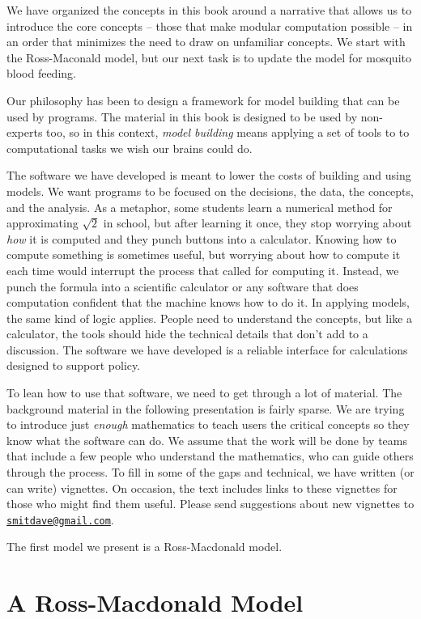 \documentclass[
]{book}
\begin{document}
We have organized the concepts in this book around a narrative that allows us to introduce the core concepts -- those that make modular computation possible -- in an order that minimizes the need to draw on unfamiliar concepts. We start with the Ross-Maconald model, but our next task is to update the model for mosquito blood feeding.

Our philosophy has been to design a framework for model building that can be used by programs. The material in this book is designed to be used by non-experts too, so in this context, \emph{model building} means applying a set of tools to to computational tasks we wish our brains could do.

The software we have developed is meant to lower the costs of building and using models. We want programs to be focused on the decisions, the data, the concepts, and the analysis. As a metaphor, some students learn a numerical method for approximating \(\sqrt{2}\) in school, but after learning it once, they stop worrying about \emph{how} it is computed and they punch buttons into a calculator. Knowing how to compute something is sometimes useful, but worrying about how to compute it each time would interrupt the process that called for computing it. Instead, we punch the formula into a scientific calculator or any software that does computation confident that the machine knows how to do it. In applying models, the same kind of logic applies. People need to understand the concepts, but like a calculator, the tools should hide the technical details that don't add to a discussion. The software we have developed is a reliable interface for calculations designed to support policy.

To lean how to use that software, we need to get through a lot of material. The background material in the following presentation is fairly sparse. We are trying to introduce just \emph{enough} mathematics to teach users the critical concepts so they know what the software can do. We assume that the work will be done by teams that include a few people who understand the mathematics, who can guide others through the process. To fill in some of the gaps and technical, we have written (or can write) vignettes. On occasion, the text includes links to these vignettes for those who might find them useful. Please send suggestions about new vignettes to \href{mailto:smitdave@gmail.com}{\nolinkurl{smitdave@gmail.com}}.

The first model we present is a Ross-Macdonald model.

\hypertarget{a-ross-macdonald-model}{%
\chapter{A Ross-Macdonald Model}\label{a-ross-macdonald-model}}
\end{document}
